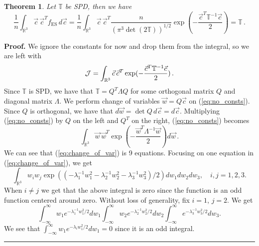 \documentclass[12pt]{CSUNthesis}
\def\T{\mathbb{T}}
\def\R{\mathbb{R}}
\newtheorem{theorem}{Theorem}
\newenvironment{proof}[1][Proof]{\noindent\textbf{#1.} }{\newline \hspace*{\textwidth}\hspace*{-0,4cm} \rule{0.5em}{0.5em} \vspace{0,2cm}}
\def\T{\mathbb{T}}
\def\R{\mathbb{R}}
\begin{document}
\begin{theorem}
Let $\T$ be SPD, then we have
\begin{equation}
\frac{1}{n} \int_{\R^3} \vec{c}\,\vec{c}^T f_{\text{ES}} \,  d\vec{c} = \frac{1}{n}\int_{\R^3} \vec{c}\,\vec{c}^T \frac{n}{(\pi^3 \det(2\T))^{1/2}} \exp(-\frac{\vec{c}^T \T^{-1} \vec{c}}{2}) = \T \, .
\end{equation}
\end{theorem}
\begin{proof}
We ignore the constants for now and drop them from the integral, so we are left with
\begin{equation}
\label{eq:no_consts}
{\cal J}= \int_{\R^3} \vec{c} \, \vec{c}^T \exp(-\frac{\vec{c}^T \T^{-1} \vec{c}}{2}) \, .
\end{equation}
Since $\T$ is SPD, we have that $\T = Q^T \Lambda Q$ for some orthogonal matrix $Q$ and diagonal matrix $\Lambda$. We perform change of variables $\vec{w} = Q\vec{c}$ on (\ref{eq:no_consts}). Since $Q$ is orthogonal, we have that $d\vec{w} = \det Q\, d \vec{c} =d\vec{c}$. Multiplying (\ref{eq:no_consts}) by $Q$ on the left and $Q^T$ on the right, (\ref{eq:no_consts}) becomes
\begin{equation}
\label{eq:change_of_var}
\int_{\R^3} \vec{w}\,\vec{w}^T \exp(-\frac{\vec{w}^T \Lambda^{-1} \vec{w}}{2}) d\vec{w}\, .
\end{equation}
We can see that (\ref{eq:change_of_var}) is 9 equations. Focusing on one equation in (\ref{eq:change_of_var}), we get
\begin{equation}
\label{eq:entries}
\int_{\R^3} w_i w_j \exp((-\lambda_1^{-1} w_1^2 - \lambda_2^{-1} w_2^2 - \lambda_3^{-1} w_3^2)/2) dw_1 dw_2 dw_3, \quad i,j=1,2,3.
\end{equation}
When $i \not = j$ we get that the above integral is zero since the function is an odd function centered around zero. Without loss of generality, fix $i=1$, $j=2$. We get 
\begin{equation*}
\int_{-\infty}^{\infty} w_1 e^{-\lambda_1^{-1}w_1^2/2} dw_1 \int_{-\infty}^{\infty} w_2 e^{-\lambda_2^{-1}w_2^2/2} dw_2 \int_{-\infty}^{\infty} e^{-\lambda_3^{-1}w_3^2/2} dw_3 .
\end{equation*}
We see that $\int_{-\infty}^{\infty} w_1 e^{-\lambda_iw_1^2/2} dw_1 = 0$ since it is an odd integral. 


\end{proof}
\end{document}
